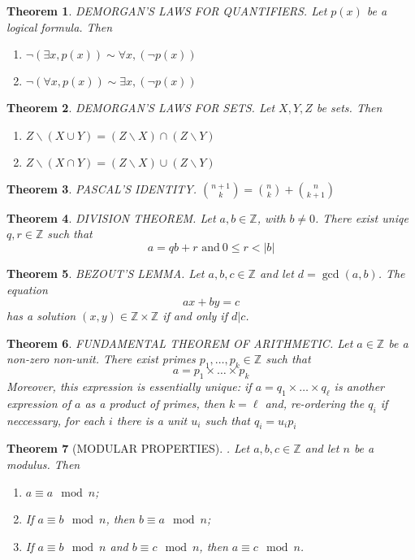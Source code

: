 \documentclass[12pt]{article}
\newtheorem{theorem}{Theorem}
\newcommand{\ba}{\backslash}
\DeclareMathOperator{\Gcd}{gcd}
\renewcommand{\gcd}[2]{\Gcd\left(#1, #2\right)}
\newcommand{\Z}{\mathbb{Z}}
\begin{document}
\begin{theorem}
DEMORGAN'S LAWS FOR QUANTIFIERS. Let $p(x)$ be a logical formula. Then
\begin{enumerate}
    \item $\neg(\exists x, p(x)) \sim \forall x, (\neg p(x))$ 
    \item $\neg(\forall x, p(x)) \sim \exists x, (\neg p(x))$
\end{enumerate}
\end{theorem}


\begin{theorem}
DEMORGAN'S LAWS FOR SETS. Let $X, Y, Z$ be sets. Then
\begin{enumerate}
    \item $Z\ba (X \cup Y) = (Z \ba X) \cap (Z \ba Y)$
    \item $Z\ba (X \cap Y) = (Z \ba X) \cup (Z \ba Y)$
\end{enumerate}
\end{theorem}


\begin{theorem}
PASCAL'S IDENTITY. $\binom{n+1}{k} = \binom{n}{k} + \binom{n}{k+1}$
\end{theorem}


\begin{theorem}
DIVISION THEOREM. Let $a, b \in \Z$, with $b\neq 0$. There exist uniqe $q, r \in \Z$ such that 
$$ a = qb + r  \text{ and}\ 0 \leq r < |b|$$
\end{theorem}


\begin{theorem}
BEZOUT'S LEMMA. Let $a, b, c \in \Z$ and let $d = \gcd{a}{b}$. The equation 
$$ax + by = c$$
has a solution $(x,y) \in \Z \times \Z$ if and only if $d | c$.  
\end{theorem}


\begin{theorem}
FUNDAMENTAL THEOREM OF ARITHMETIC. Let $a \in \Z$ be a non-zero non-unit. There exist primes $p_1, \dots, p_k \in \Z$ such that 
$$a = p_1 \times \dots \times p_k$$
Moreover, this expression is essentially unique: if $a = q_1 \times \dots \times q_\ell$ is another expression of $a$ as a product of primes, then $k = \ell$ and, re-ordering the $q_i$ if neccessary, for each $i$ there is a unit $u_i$ such that $q_i = u_ip_i$
\end{theorem}


\begin{theorem}
[MODULAR PROPERTIES]. Let $a, b, c \in \Z$ and let $n$ be a modulus. Then
\begin{enumerate}
    \item $a \equiv a \mod{n}$;
    \item If $a \equiv b \mod{n}$, then $b \equiv a \mod{n}$;
    \item If $a \equiv b \mod{n}$ and $b \equiv c \mod{n}$, then $a \equiv c \mod{n}$.
\end{enumerate}
\end{theorem}
\end{document}
